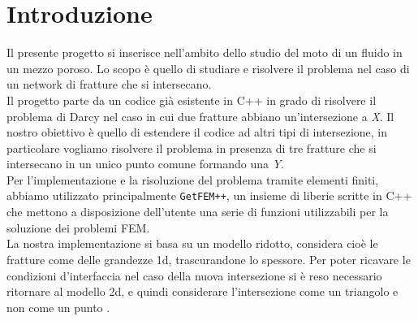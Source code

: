 \chapter*{Introduzione}

Il presente progetto si inserisce nell'ambito dello studio del moto di un fluido in un mezzo poroso.\cite{habilitationsschrift}
Lo scopo è quello di studiare e risolvere il problema nel caso di un network di fratture che si intersecano. \\
Il progetto parte da un codice già esistente in C++ in grado di risolvere il problema di Darcy nel caso in cui due fratture abbiano un'intersezione a \textit{X}. \cite{ESAIM}
Il nostro obiettivo è quello di estendere il codice ad altri tipi di intersezione, in particolare vogliamo risolvere il problema in presenza di tre fratture che si intersecano in un unico punto comune formando una \textit{Y}.\\
Per l'implementazione e la risoluzione del problema tramite elementi finiti, abbiamo utilizzato principalmente \texttt{GetFEM++}, un insieme di liberie scritte in C++ che mettono a disposizione dell'utente una serie di funzioni utilizzabili per la soluzione dei problemi FEM. \\
La nostra implementazione si basa su un modello ridotto, considera cioè le fratture come delle grandezze 1d, trascurandone lo spessore. Per poter ricavare le condizioni d'interfaccia nel caso della nuova intersezione si è reso necessario ritornare al modello 2d, e quindi considerare l'intersezione come un triangolo e non come un punto \cite{Paper} \cite{LDAP}.